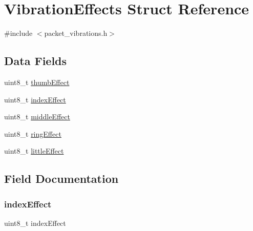 \hypertarget{struct_vibration_effects}{}\section{Vibration\+Effects Struct Reference}
\label{struct_vibration_effects}


{\ttfamily \#include $<$packet\+\_\+vibrations.\+h$>$}

\subsection*{Data Fields}
\begin{DoxyCompactItemize}
\item 
uint8\+\_\+t \hyperlink{struct_vibration_effects_a7f845267ae38f6e155a7e4d63a4a95ee}{thumb\+Effect}
\item 
uint8\+\_\+t \hyperlink{struct_vibration_effects_ae4d8d97ddb5fcbfc2cb652287e681d53}{index\+Effect}
\item 
uint8\+\_\+t \hyperlink{struct_vibration_effects_a6ded34d8663a70c8781258e2fed74c2f}{middle\+Effect}
\item 
uint8\+\_\+t \hyperlink{struct_vibration_effects_a0bc08c517fd75c56e8cec76389a596d6}{ring\+Effect}
\item 
uint8\+\_\+t \hyperlink{struct_vibration_effects_a6bc8be01c2cb3cb908c67d180ab1f199}{little\+Effect}
\end{DoxyCompactItemize}


\subsection{Field Documentation}
\mbox{\label{struct_vibration_effects_ae4d8d97ddb5fcbfc2cb652287e681d53}} 
\subsubsection{\texorpdfstring{index\+Effect}{indexEffect}}
{\footnotesize\ttfamily uint8\+\_\+t index\+Effect}

\mbox{\label{struct_vibration_effects_a6bc8be01c2cb3cb908c67d180ab1f199}} 
